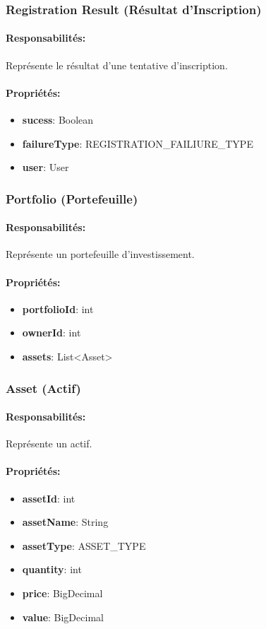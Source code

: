 \documentclass{article}
\begin{document}
\subsubsection{Registration Result (Résultat d'Inscription)}
\paragraph{Responsabilités:} Représente le résultat d'une tentative d'inscription.
\paragraph{Propriétés:}
\begin{itemize}
  \item \textbf{sucess}: Boolean
  \item \textbf{failureType}: REGISTRATION\_FAILIURE\_TYPE
  \item \textbf{user}: User
\end{itemize}
\subsubsection{Portfolio (Portefeuille)}
\paragraph{Responsabilités:} Représente un portefeuille d'investissement.
\paragraph{Propriétés:}
\begin{itemize}
  \item \textbf{portfolioId}: int
  \item \textbf{ownerId}: int
  \item \textbf{assets}: List<Asset>
\end{itemize}
\subsubsection{Asset (Actif)}
\paragraph{Responsabilités:} Représente un actif.
\paragraph{Propriétés:}
\begin{itemize}
  \item \textbf{assetId}: int
  \item \textbf{assetName}: String
  \item \textbf{assetType}: ASSET\_TYPE
  \item \textbf{quantity}: int
  \item \textbf{price}: BigDecimal
  \item \textbf{value}: BigDecimal
\end{itemize}
\end{document}
